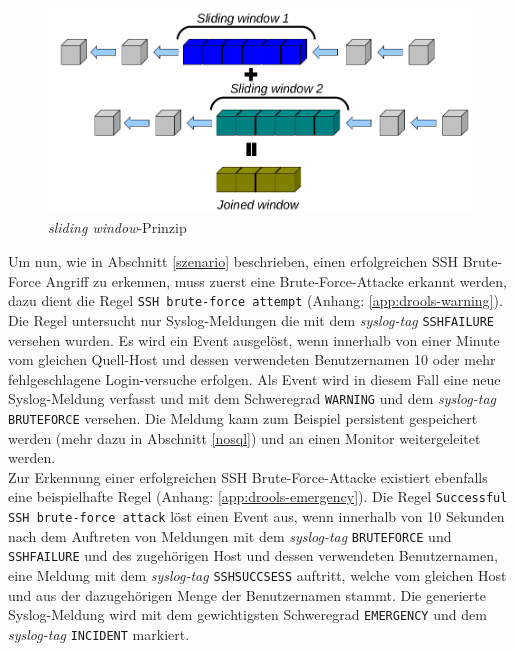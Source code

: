 \begin{figure}[htbp]
    \caption{\textit{sliding window}-Prinzip}
    \label{pic:drools}\vspace{0.2cm}
    \centering
    \includegraphics[scale=0.36]{img/drools-slide-00}
    
\end{figure}

Um nun, wie in Abschnitt \ref{szenario} beschrieben, einen erfolgreichen SSH Brute-Force 
Angriff zu erkennen, muss zuerst eine Brute-Force-Attacke erkannt werden, dazu dient die 
Regel \texttt{SSH brute-force attempt} (Anhang: \ref{app:drools-warning}). Die Regel 
untersucht nur Syslog-Meldungen die mit dem \textit{syslog-tag} \texttt{SSHFAILURE} 
versehen wurden. Es wird ein Event ausgelöst, wenn innerhalb von einer Minute vom 
gleichen Quell-Host und dessen verwendeten Benutzernamen 10 oder mehr fehlgeschlagene 
Login-versuche erfolgen. Als Event wird in diesem Fall eine neue Syslog-Meldung verfasst 
und mit dem Schweregrad \texttt{WARNING} und dem \textit{syslog-tag} \texttt{BRUTEFORCE} 
versehen. Die Meldung kann zum Beispiel persistent gespeichert werden (mehr dazu in 
Abschnitt \ref{nosql}) und an einen Monitor weitergeleitet werden.\\

Zur Erkennung einer erfolgreichen SSH Brute-Force-Attacke existiert ebenfalls eine 
beispielhafte Regel (Anhang: \ref{app:drools-emergency}). Die Regel \texttt{Successful 
SSH brute-force attack} löst einen Event aus, wenn innerhalb von 10 Sekunden nach dem 
Auftreten von Meldungen mit dem \textit{syslog-tag} \texttt{BRUTEFORCE} und 
\texttt{SSHFAILURE} und des zugehörigen Host und dessen verwendeten Benutzernamen, eine 
Meldung mit dem \textit{syslog-tag} \texttt{SSHSUCCSESS} auftritt, welche vom 
gleichen Host und aus der dazugehörigen Menge der Benutzernamen stammt.
Die generierte Syslog-Meldung wird mit dem gewichtigsten Schweregrad \texttt{EMERGENCY} 
und dem \textit{syslog-tag} \texttt{INCIDENT} markiert.\\

